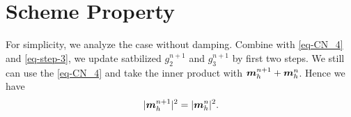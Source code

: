 \documentclass[preprint,times,3p]{elsarticle}
\def\m{\mbox{\boldmath $m$}}
\begin{document}








\section{Scheme Property}
For simplicity, we analyze the case without damping. Combine with \cref{eq-CN_4} and \cref{eq-step-3}, we update satbilized $g_2^{n+1}$ and $g_3^{n+1}$ by first two steps. We still can use the \cref{eq-CN_4} and take the inner product with $\m_h^{n+1}+\m_h^n$. Hence we have
\begin{align*}
    |\m_h^{n+1}|^2=|\m_h^{n}|^2.
\end{align*}
\end{document}
